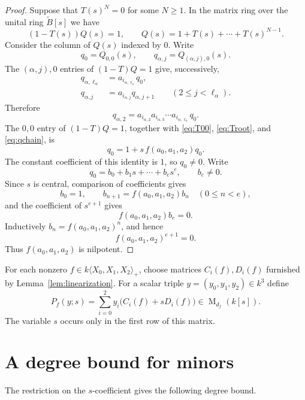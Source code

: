 \documentclass[11pt]{article}
\newcommand{\Mat}{\operatorname{M}}
\newcommand{\Free}{k\langle X_0,X_1,X_2\rangle_+}
\begin{document}
\begin{proof}
Suppose that $T(s)^N=0$ for some $N\ge1$.  In the matrix ring over the unital ring $\widetilde B[s]$ we have
\[
(1-T(s))Q(s)=1,
\qquad
Q(s)=1+T(s)+\cdots+T(s)^{N-1}.
\]
Consider the column of $Q(s)$ indexed by $0$.  Write
\[
q_0=Q_{0,0}(s),
\qquad
q_{\alpha,j}=Q_{(\alpha,j),0}(s).
\]
The $(\alpha,j),0$ entries of $(1-T)Q=1$ give, successively,
\begin{align*}
q_{\alpha,\ell_\alpha}
&=a_{i_{\alpha,\ell_\alpha}}q_0,\\
q_{\alpha,j}
&=a_{i_{\alpha,j}}q_{\alpha,j+1}
\qquad(2\le j<\ell_\alpha).
\end{align*}
Therefore
\begin{equation}\label{eq:qchain}
q_{\alpha,2}
=a_{i_{\alpha,2}}a_{i_{\alpha,3}}\cdots a_{i_{\alpha,\ell_\alpha}}q_0.
\end{equation}
The $0,0$ entry of $(1-T)Q=1$, together with \eqref{eq:T00}, \eqref{eq:Troot}, and \eqref{eq:qchain}, is
\[
q_0
=1+s\,f(a_0,a_1,a_2)q_0.
\]
The constant coefficient of this identity is $1$, so $q_0\ne0$.  Write
\[
q_0=b_0+b_1s+\cdots+b_es^e,
\qquad b_e\ne0.
\]
Since $s$ is central, comparison of coefficients gives
\[
b_0=1,
\qquad
b_{n+1}=f(a_0,a_1,a_2)b_n
\quad(0\le n<e),
\]
and the coefficient of $s^{e+1}$ gives
\[
f(a_0,a_1,a_2)b_e=0.
\]
Inductively $b_n=f(a_0,a_1,a_2)^n$, and hence
\[
f(a_0,a_1,a_2)^{e+1}=0.
\]
Thus $f(a_0,a_1,a_2)$ is nilpotent.
\end{proof}

For each nonzero $f\in\Free$, choose matrices $C_i(f),D_i(f)$ furnished by Lemma~\ref{lem:linearization}.  For a scalar triple $y=(y_0,y_1,y_2)\in k^3$ define
\begin{equation}\label{eq:scalar-pencil}
P_f(y;s)=\sum_{i=0}^2 y_i\bigl(C_i(f)+sD_i(f)\bigr)
\in\Mat_{d_f}(k[s]).
\end{equation}
The variable $s$ occurs only in the first row of this matrix.

\section{A degree bound for minors}

The restriction on the $s$-coefficient gives the following degree bound.
\end{document}
